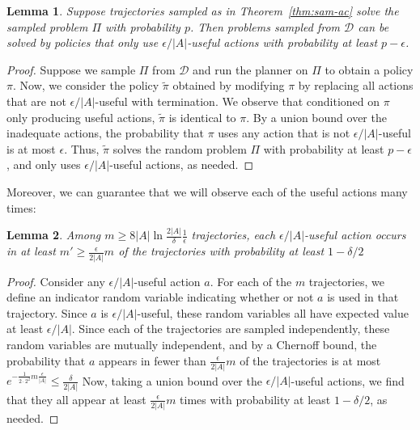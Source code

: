 \documentclass[letterpaper]{article} %
\newtheorem{lemma}{Lemma}
\begin{document}
\begin{lemma}\label{lem:only-useful}
Suppose trajectories sampled as in Theorem~\ref{thm:sam-ac} solve the sampled problem $\Pi$ with probability $p$.
Then problems sampled from $\mathcal{D}$ can be solved by policies that only use $\epsilon/|A|$-useful actions with probability at least $p-\epsilon$.
\end{lemma}
\begin{proof}
Suppose we sample $\Pi$ from $\mathcal{D}$ and run the planner on $\Pi$ to obtain a policy $\pi$. 
Now, we consider the policy $\tilde{\pi}$ obtained by modifying $\pi$ by replacing all actions that are not $\epsilon/|A|$-useful with termination. We observe that conditioned on $\pi$ only producing useful actions, $\tilde{\pi}$ is identical to $\pi$. By a union bound over the inadequate actions, the probability that $\pi$ uses any action that is not $\epsilon/|A|$-useful is at most $\epsilon$.  Thus, $\tilde{\pi}$ solves the random problem $\Pi$ with probability at least $p-\epsilon$, and only uses $\epsilon/|A|$-useful actions, as needed.
\end{proof}

\noindent
Moreover, 
we can guarantee that we will observe each of the useful actions many times:

\begin{lemma}\label{lem:many-useful}
Among  $m \geq 8|A|\ln\frac{2|A|}{\delta}\frac{1}{\epsilon}$
trajectories, each $\epsilon/|A|$-useful action occurs in at least
$m' \geq \frac{\epsilon}{2|A|}m$
of the trajectories with probability at least $1-\delta/2$
\end{lemma}
\begin{proof}
Consider any $\epsilon/|A|$-useful action $a$. For each of the $m$ trajectories, we define an indicator random variable indicating whether or not $a$ is used in that trajectory. Since $a$ is $\epsilon/|A|$-useful, these random variables all have expected value at least $\epsilon/|A|$. Since each of the trajectories are sampled independently, these random variables are mutually independent, and by a Chernoff bound, the probability that $a$ appears in fewer than $\frac{\epsilon}{2|A|}m$ of the trajectories is at most
$
e^{-\frac{1}{2\cdot 2^2}m\frac{\epsilon}{|A|}}\leq\frac{\delta}{2|A|}
$
Now, taking a union bound over the $\epsilon/|A|$-useful actions, we find that they all appear at least $\frac{\epsilon}{2|A|}m$ times with probability at least $1-\delta/2$, as needed.
\end{proof}
\end{document}
